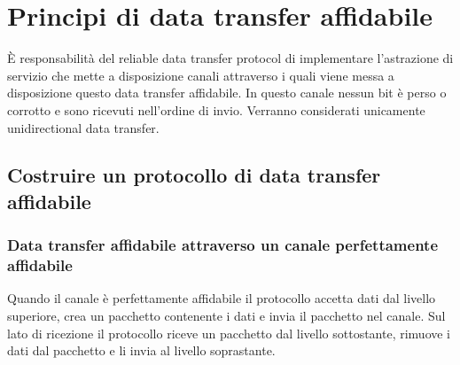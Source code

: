 \section{Principi di data transfer affidabile}
\`E responsabilit\`a del reliable data transfer protocol di implementare l'astrazione di servizio che mette a disposizione canali attraverso i quali viene
messa a disposizione questo data transfer affidabile. In questo canale nessun bit \`e perso o corrotto e sono ricevuti nell'ordine di invio. Verranno 
considerati unicamente unidirectional data transfer.
\subsection{Costruire un protocollo di data transfer affidabile}
\subsubsection{Data transfer affidabile attraverso un canale perfettamente affidabile}
Quando il canale \`e perfettamente affidabile il protocollo accetta dati dal livello superiore, crea un pacchetto contenente i dati e invia il pacchetto nel
canale. Sul lato di ricezione il protocollo riceve un pacchetto dal livello sottostante, rimuove i dati dal pacchetto e li invia al livello soprastante. 
